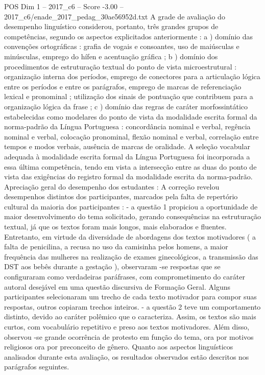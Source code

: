 \begin{textsample}{POS Dim 1 – 2017\_c6 – Score -3.00 – 2017\_c6/enade\_2017\_pedag\_30ae56952d.txt}
A grade de avaliação do desempenho linguístico considerou, portanto, três grandes grupos de competências, segundo os aspectos explicitados anteriormente : a ) domínio das convenções ortográficas : grafia de vogais e consoantes, uso de maiúsculas e minúsculas, emprego do hífen e acentuação gráfica ; b ) domínio dos procedimentos de estruturação textual do ponto de vista microestrutural : organização interna dos períodos, emprego de conectores para a articulação lógica entre os períodos e entre os parágrafos, emprego de marcas de referenciação lexical e pronominal ; utilização dos sinais de pontuação que contribuem para a organização lógica da frase ; c ) domínio das regras de caráter morfossintático estabelecidas como modelares do ponto de vista da modalidade escrita formal da norma-padrão da Língua Portuguesa : concordância nominal e verbal, regência nominal e verbal, colocação pronominal, flexão nominal e verbal, correlação entre tempos e modos verbais, ausência de marcas de oralidade.
A seleção vocabular adequada à modalidade escrita formal da Língua Portuguesa foi incorporada a essa última competência, tendo em vista a intersecção entre as duas do ponto de vista das exigências do registro formal da modalidade escrita da norma-padrão.
Apreciação geral do desempenho dos estudantes : A correção revelou desempenhos distintos dos participantes, marcados pela falta de repertório cultural da maioria dos participantes : - a questão 1 propiciou a oportunidade de maior desenvolvimento do tema solicitado, gerando consequências na estruturação textual, já que os textos foram mais longos, mais elaborados e fluentes.
Entretanto, em virtude da diversidade de abordagens dos textos motivadores ( a falta de penicilina, a recusa no uso da camisinha pelos homens, a maior frequência das mulheres na realização de exames ginecológicos, a transmissão das DST aos bebês durante a gestação ), observaram -se respostas que se configuraram como verdadeiras paráfrases, com comprometimento do caráter autoral desejável em uma questão discursiva de Formação Geral.
Alguns participantes selecionaram um trecho de cada texto motivador para compor suas respostas, outros copiaram trechos inteiros. - a questão 2 teve um comportamento distinto, devido ao caráter polêmico que o caracteriza.
Assim, os textos são mais curtos, com vocabulário repetitivo e preso aos textos motivadores.
Além disso, observou -se grande ocorrência de protesto em função do tema, ora por motivos religiosos ora por preconceito de gênero.
Quanto aos aspectos linguísticos analisados durante esta avaliação, os resultados observados estão descritos nos parágrafos seguintes.

\end{textsample}
